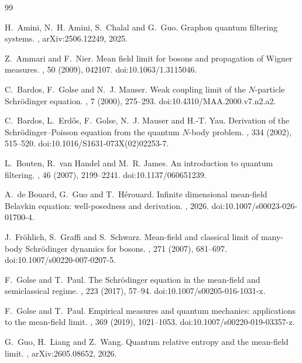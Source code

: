 \documentclass[10pt,a4paper,reqno]{amsart}
\numberwithin{equation}{section}
\theoremstyle{plain}
\theoremstyle{definition}
\theoremstyle{remark}
\newcommand{\1}{\mathbf 1}
\begin{document}
\begin{thebibliography}{99}

H.~Amini, N.~H. Amini, S.~Chalal and G.~Guo.
\newblock Graphon quantum filtering systems.
, arXiv:2506.12249, 2025.

Z.~Ammari and F.~Nier.
\newblock Mean field limit for bosons and propagation of Wigner measures.
, 50 (2009), 042107.
\newblock doi:10.1063/1.3115046.

C.~Bardos, F.~Golse and N.~J. Mauser.
\newblock Weak coupling limit of the \(N\)-particle Schr\"odinger equation.
, 7 (2000), 275--293.
\newblock doi:10.4310/MAA.2000.v7.n2.a2.

C.~Bardos, L.~Erd\H{o}s, F.~Golse, N.~J. Mauser and H.-T. Yau.
\newblock Derivation of the Schr\"odinger--Poisson equation from the quantum
\(N\)-body problem.
, 334 (2002), 515--520.
\newblock doi:10.1016/S1631-073X(02)02253-7.

L.~Bouten, R.~van Handel and M.~R. James.
\newblock An introduction to quantum filtering.
, 46 (2007), 2199--2241.
\newblock doi:10.1137/060651239.

A.~de Bouard, G.~Guo and T.~H\'erouard.
\newblock Infinite dimensional mean-field Belavkin equation: well-posedness
and derivation.
, 2026.
\newblock doi:10.1007/s00023-026-01700-4.

J.~Fr\"ohlich, S.~Graffi and S.~Schwarz.
\newblock Mean-field and classical limit of many-body Schr\"odinger dynamics
for bosons.
, 271 (2007), 681--697.
\newblock doi:10.1007/s00220-007-0207-5.

F.~Golse and T.~Paul.
\newblock The Schr\"odinger equation in the mean-field and semiclassical
regime.
, 223 (2017), 57--94.
\newblock doi:10.1007/s00205-016-1031-x.

F.~Golse and T.~Paul.
\newblock Empirical measures and quantum mechanics: applications to the
mean-field limit.
, 369 (2019), 1021--1053.
\newblock doi:10.1007/s00220-019-03357-z.

G.~Guo, H.~Liang and Z.~Wang.
\newblock Quantum relative entropy and the mean-field limit.
, arXiv:2605.08652, 2026.


\end{thebibliography}
\end{document}
